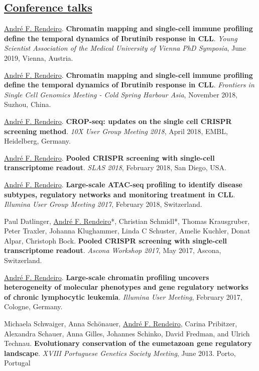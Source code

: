 \documentclass[11pt,a4paper,roman]{moderncv} %
\begin{document}
    \subsection{\underline{Conference talks}}
        \begin{etaremune}[leftmargin=2.5cm,itemindent=0pt,topsep=10pt,itemsep=2pt,partopsep=0pt,parsep=0pt]
        \item \underline{André F. Rendeiro}. \textbf{Chromatin mapping and single-cell immune profiling define the temporal dynamics of Ibrutinib response in CLL}. \textit{Young Scientist Association of the Medical University of Vienna PhD Symposia}, June 2019, Vienna, Austria.
        \item \underline{André F. Rendeiro}. \textbf{Chromatin mapping and single-cell immune profiling define the temporal dynamics of Ibrutinib response in CLL}. \textit{Frontiers in Single Cell Genomics Meeting - Cold Spring Harbour Asia}, November 2018, Suzhou, China.
        \item \underline{André F. Rendeiro}. \textbf{CROP-seq: updates on the single cell CRISPR screening method}. \textit{10X User Group Meeting 2018}, April 2018, EMBL, Heidelberg, Germany.
        \item \underline{André F. Rendeiro}. \textbf{Pooled CRISPR screening with single-cell transcriptome readout}. \textit{SLAS 2018}, February 2018, San Diego, USA.
        \item \underline{André F. Rendeiro}. \textbf{Large-scale ATAC-seq profiling to identify disease subtypes, regulatory networks and monitoring treatment in CLL}. \textit{Illumina User Group Meeting 2017}, February 2018, Switzerland.
        \item Paul Datlinger, \underline{André F. Rendeiro}*, Christian Schmidl*, Thomas Krausgruber, Peter Traxler, Johanna Klughammer, Linda C Schuster, Amelie Kuchler, Donat Alpar, Christoph Bock. \textbf{Pooled CRISPR screening with single-cell transcriptome readout}. \textit{Ascona Workshop 2017}, May 2017, Ascona, Switzerland.
        \item \underline{André F. Rendeiro}. \textbf{Large-scale chromatin profiling uncovers heterogeneity of molecular phenotypes and gene regulatory networks of chronic lymphocytic leukemia}. \textit{Illumina User Meeting}, February 2017, Cologne, Germany.
        \item Michaela Schwaiger, Anna Schönauer, \underline{André F. Rendeiro}, Carina Pribitzer, Alexandra Schauer, Anna Gilles, Johannes Schinko, David Fredman, and Ulrich Technau. \textbf{Evolutionary conservation of the eumetazoan gene regulatory landscape}. \textit{XVIII Portuguese Genetics Society Meeting}, June 2013. Porto, Portugal
        \end{etaremune}
\end{document}
